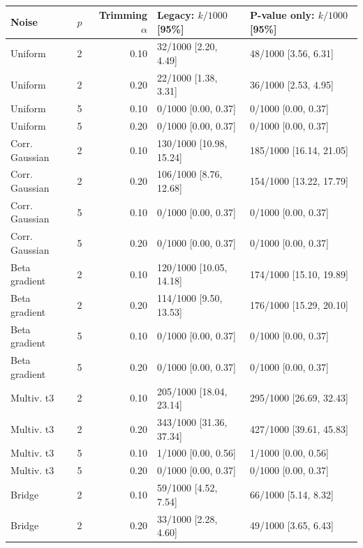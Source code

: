 \begin{table}[htbp]
\caption{}
\label{tab:r2c1-null-controls}
\centering\scriptsize
\setlength{\tabcolsep}{3pt}
\begin{tabular}{lrrll}
\toprule Noise & $p$ & Trimming $\alpha$ & Legacy: $k/1000$ [95\%] & P-value only: $k/1000$ [95\%] \\
\midrule
Uniform & 2 & 0.10 & 32/1000 [2.20, 4.49] & 48/1000 [3.56, 6.31] \\
Uniform & 2 & 0.20 & 22/1000 [1.38, 3.31] & 36/1000 [2.53, 4.95] \\
Uniform & 5 & 0.10 & 0/1000 [0.00, 0.37] & 0/1000 [0.00, 0.37] \\
Uniform & 5 & 0.20 & 0/1000 [0.00, 0.37] & 0/1000 [0.00, 0.37] \\
Corr. Gaussian & 2 & 0.10 & 130/1000 [10.98, 15.24] & 185/1000 [16.14, 21.05] \\
Corr. Gaussian & 2 & 0.20 & 106/1000 [8.76, 12.68] & 154/1000 [13.22, 17.79] \\
Corr. Gaussian & 5 & 0.10 & 0/1000 [0.00, 0.37] & 0/1000 [0.00, 0.37] \\
Corr. Gaussian & 5 & 0.20 & 0/1000 [0.00, 0.37] & 0/1000 [0.00, 0.37] \\
Beta gradient & 2 & 0.10 & 120/1000 [10.05, 14.18] & 174/1000 [15.10, 19.89] \\
Beta gradient & 2 & 0.20 & 114/1000 [9.50, 13.53] & 176/1000 [15.29, 20.10] \\
Beta gradient & 5 & 0.10 & 0/1000 [0.00, 0.37] & 0/1000 [0.00, 0.37] \\
Beta gradient & 5 & 0.20 & 0/1000 [0.00, 0.37] & 0/1000 [0.00, 0.37] \\
Multiv. t3 & 2 & 0.10 & 205/1000 [18.04, 23.14] & 295/1000 [26.69, 32.43] \\
Multiv. t3 & 2 & 0.20 & 343/1000 [31.36, 37.34] & 427/1000 [39.61, 45.83] \\
Multiv. t3 & 5 & 0.10 & 1/1000 [0.00, 0.56] & 1/1000 [0.00, 0.56] \\
Multiv. t3 & 5 & 0.20 & 0/1000 [0.00, 0.37] & 0/1000 [0.00, 0.37] \\
Bridge & 2 & 0.10 & 59/1000 [4.52, 7.54] & 66/1000 [5.14, 8.32] \\
Bridge & 2 & 0.20 & 33/1000 [2.28, 4.60] & 49/1000 [3.65, 6.43] \\

\end{tabular}
\end{table}
